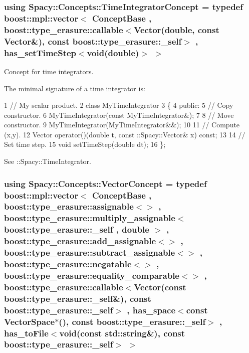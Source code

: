 \subsubsection[{Time\+Integrator\+Concept}]{\setlength{\rightskip}{0pt plus 5cm}using {\bf Spacy\+::\+Concepts\+::\+Time\+Integrator\+Concept} = typedef boost\+::mpl\+::vector$<$ Concept\+Base , boost\+::type\+\_\+erasure\+::callable$<$Vector(double, const Vector\&), const boost\+::type\+\_\+erasure\+::\+\_\+self$>$ , has\+\_\+set\+Time\+Step$<$void(double)$>$ $>$}\label{group__ConceptGroup_ga45ecfe57ffb996aa97c9ff89a647f095_ga45ecfe57ffb996aa97c9ff89a647f095}


Concept for time integrators. 

\label{group__ConceptGroup_ga45ecfe57ffb996aa97c9ff89a647f095_TimeIntegratorConceptAnchor}%
\hypertarget{group__ConceptGroup_ga45ecfe57ffb996aa97c9ff89a647f095_TimeIntegratorConceptAnchor}{}%
The minimal signature of a time integrator is\+: 
\begin{DoxyCode}
1 // My scalar product.
2 class MyTimeIntegrator
3 \{
4 public:
5   // Copy constructor.
6   MyTimeIntegrator(const MyTimeIntegrator&);
7 
8   // Move constructor.
9   MyTimeIntegrator(MyTimeIntegrator&&);
10 
11   // Compute (x,y).
12   Vector operator()(double t, const ::Spacy::Vector& x) const;
13 
14   // Set time step.
15   void setTimeStep(double dt);
16 \};
\end{DoxyCode}


See \+:\+:Spacy\+:\+:Time\+Integrator. \hypertarget{group__ConceptGroup_gad6958389d1fa2758a8a64a0a24c36004_gad6958389d1fa2758a8a64a0a24c36004}{}
\subsubsection[{Vector\+Concept}]{\setlength{\rightskip}{0pt plus 5cm}using {\bf Spacy\+::\+Concepts\+::\+Vector\+Concept} = typedef boost\+::mpl\+::vector$<$ Concept\+Base , boost\+::type\+\_\+erasure\+::assignable$<$$>$ , boost\+::type\+\_\+erasure\+::multiply\+\_\+assignable$<$ boost\+::type\+\_\+erasure\+::\+\_\+self , double $>$ , boost\+::type\+\_\+erasure\+::add\+\_\+assignable$<$$>$ , boost\+::type\+\_\+erasure\+::subtract\+\_\+assignable$<$$>$ , boost\+::type\+\_\+erasure\+::negatable$<$$>$ , boost\+::type\+\_\+erasure\+::equality\+\_\+comparable$<$$>$ , boost\+::type\+\_\+erasure\+::callable$<$Vector(const boost\+::type\+\_\+erasure\+::\+\_\+self\&), const boost\+::type\+\_\+erasure\+::\+\_\+self$>$ , has\+\_\+space$<$const Vector\+Space$\ast$(), const boost\+::type\+\_\+erasure\+::\+\_\+self$>$ , has\+\_\+to\+File$<$void(const std\+::string\&), const boost\+::type\+\_\+erasure\+::\+\_\+self$>$ $>$}\label{group__ConceptGroup_gad6958389d1fa2758a8a64a0a24c36004_gad6958389d1fa2758a8a64a0a24c36004}


